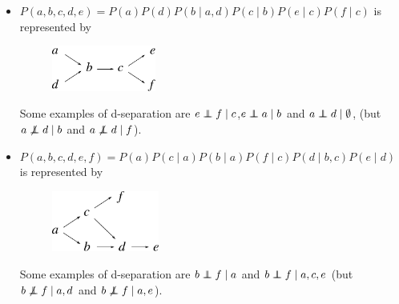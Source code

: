 \begin{itemize}
	\item $P(a, b, c, d, e) = P(a)P(d) P(b\;|\;a,d) P(c\;|\;b) P(e\;|\;c) P(f\;|\;c)$ is represented by 

	\begin{figure}[h!]
	\centering
		\includegraphics[height=15mm]{./figs/04-abcdef.pdf} 
	\end{figure}
	Some examples of d-separation are $e \independent f \;|\; c$,\quad $e \independent a \;|\; b$ and $a \independent d \;|\;\emptyset$, (but $a \not\independent d \;|\;b$ and $a \not\independent d \;|\;f$).

	\item $P(a, b, c, d, e, f) = P(a) P(c\;|\;a) P(b\;|\;a) P(f\;|\;c) P(d\;|\;b, c) P(e\;|\;d)$ is represented by

	\begin{figure}[h!]
	\centering
		\includegraphics[height=20mm]{./figs/04-abcdef2.pdf} 
	\end{figure}
	Some examples of d-separation are $b \independent f \;|\; a$ and  $b \independent f \;|\; a,c,e$ (but $b \not\independent f \;|\; a,d$ and $b \not\independent f \;|\; a,e$).
\end{itemize}

\newpage
